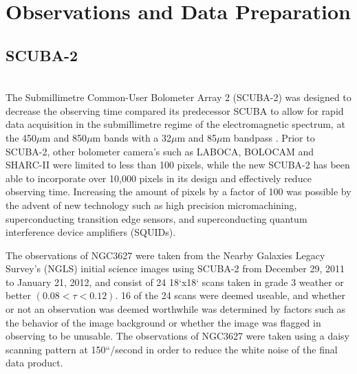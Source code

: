

\chapter{Observations and Data Preparation}\label{observations}

\section{SCUBA-2} \\
The Submillimetre Common-User Bolometer Array 2 (SCUBA-2) was designed to decrease the observing time compared its predecessor SCUBA to allow for rapid data acquisition in the submillimetre regime of the electromagnetic spectrum, at the 450$\mu$m and 850$\mu$m bands with a 32$\mu$m and 85$\mu$m bandpass \citet{holland2013}.  Prior to SCUBA-2, other bolometer camera's such as LABOCA, BOLOCAM and SHARC-II were limited to less than 100 pixels, while the new SCUBA-2 has been able to incorporate over 10,000 pixels in its design and effectively reduce observing time.  Increasing the amount of pixels by a factor of 100 was possible by the advent of new technology such as high precision micromachining, superconducting transition edge sensors, and superconducting quantum interference device amplifiers (SQUIDs)\citet{holland2013}.

The observations of NGC3627 were taken from the Nearby Galaxies Legacy Survey's (NGLS) initial science images using SCUBA-2 from December 29, 2011  to January 21, 2012, and consist of 24 18`x18` scans taken in grade 3 weather or better $(0.08 < \tau <0.12)$.  16 of the 24 scans were deemed useable, and whether or not an observation was deemed worthwhile was determined by factors such as the behavior of the image background or whether the image was flagged in observing to be unusable.  The observations of NGC3627 were taken using a daisy scanning pattern at 150``/second in order to reduce the white noise of the final data product. 

